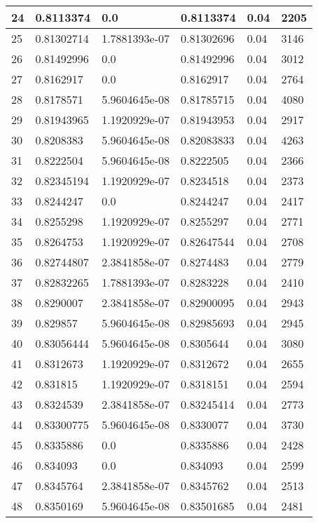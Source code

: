 \begin{longtable}{|l|l|l|l|l|l|}
24 & 0.8113374 & 0.0 & 0.8113374 & 0.04 & 2205 \\ \hline 
25 & 0.81302714 & 1.7881393e-07 & 0.81302696 & 0.04 & 3146 \\ \hline 
26 & 0.81492996 & 0.0 & 0.81492996 & 0.04 & 3012 \\ \hline 
27 & 0.8162917 & 0.0 & 0.8162917 & 0.04 & 2764 \\ \hline 
28 & 0.8178571 & 5.9604645e-08 & 0.81785715 & 0.04 & 4080 \\ \hline 
29 & 0.81943965 & 1.1920929e-07 & 0.81943953 & 0.04 & 2917 \\ \hline 
30 & 0.8208383 & 5.9604645e-08 & 0.82083833 & 0.04 & 4263 \\ \hline 
31 & 0.8222504 & 5.9604645e-08 & 0.8222505 & 0.04 & 2366 \\ \hline 
32 & 0.82345194 & 1.1920929e-07 & 0.8234518 & 0.04 & 2373 \\ \hline 
33 & 0.8244247 & 0.0 & 0.8244247 & 0.04 & 2417 \\ \hline 
34 & 0.8255298 & 1.1920929e-07 & 0.8255297 & 0.04 & 2771 \\ \hline 
35 & 0.8264753 & 1.1920929e-07 & 0.82647544 & 0.04 & 2708 \\ \hline 
36 & 0.82744807 & 2.3841858e-07 & 0.8274483 & 0.04 & 2779 \\ \hline 
37 & 0.82832265 & 1.7881393e-07 & 0.8283228 & 0.04 & 2410 \\ \hline 
38 & 0.8290007 & 2.3841858e-07 & 0.82900095 & 0.04 & 2943 \\ \hline 
39 & 0.829857 & 5.9604645e-08 & 0.82985693 & 0.04 & 2945 \\ \hline 
40 & 0.83056444 & 5.9604645e-08 & 0.8305644 & 0.04 & 3080 \\ \hline 
41 & 0.8312673 & 1.1920929e-07 & 0.8312672 & 0.04 & 2655 \\ \hline 
42 & 0.831815 & 1.1920929e-07 & 0.8318151 & 0.04 & 2594 \\ \hline 
43 & 0.8324539 & 2.3841858e-07 & 0.83245414 & 0.04 & 2773 \\ \hline 
44 & 0.83300775 & 5.9604645e-08 & 0.8330077 & 0.04 & 3730 \\ \hline 
45 & 0.8335886 & 0.0 & 0.8335886 & 0.04 & 2428 \\ \hline 
46 & 0.834093 & 0.0 & 0.834093 & 0.04 & 2599 \\ \hline 
47 & 0.8345764 & 2.3841858e-07 & 0.8345762 & 0.04 & 2513 \\ \hline 
48 & 0.8350169 & 5.9604645e-08 & 0.83501685 & 0.04 & 2481 \\ \hline 

\end{longtable}

